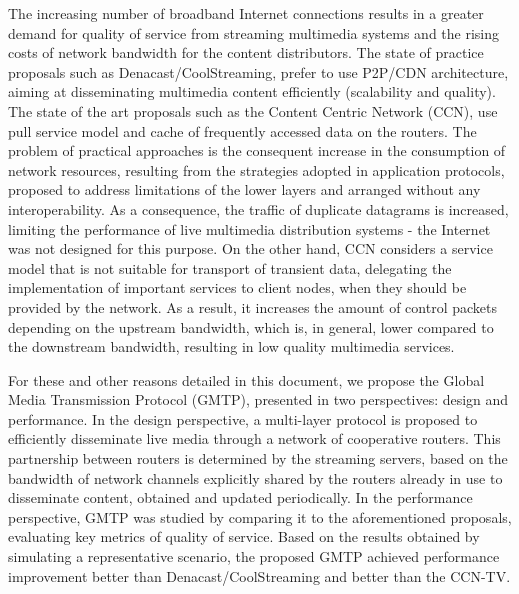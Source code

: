 The increasing number of broadband Internet connections results in a greater demand for quality of service from streaming multimedia systems and the rising costs of network bandwidth for the content distributors. The state of practice proposals such as Denacast/CoolStreaming, prefer to use P2P/CDN architecture, aiming at disseminating multimedia content efficiently (scalability and quality). The state of the art proposals such as the Content Centric Network (CCN), use pull service model and cache of frequently accessed data on the routers. The problem of practical approaches is the consequent increase in the consumption of network resources, resulting from the strategies adopted in application protocols, proposed to address limitations of the lower layers and arranged without any interoperability. As a consequence, the traffic of duplicate datagrams is increased, limiting the performance of live multimedia distribution systems - the Internet was not designed for this purpose. On the other hand, CCN considers a service model that is not suitable for transport of transient data, delegating the implementation of important services to client nodes, when they should be provided by the network. As a result, it increases the amount of control packets depending on the upstream bandwidth, which is, in general, lower compared to the downstream bandwidth, resulting in low quality multimedia services.

For these and other reasons detailed in this document, we propose the Global Media Transmission Protocol (GMTP), presented in two perspectives: design and performance. In the design perspective, a multi-layer protocol is proposed to efficiently disseminate live media through a network of cooperative routers. This partnership between routers is determined by the streaming servers, based on the bandwidth of network channels explicitly shared by the routers already in use to disseminate content, obtained and updated periodically. In the performance perspective, GMTP was studied by comparing it to the aforementioned proposals, evaluating key metrics of quality of service. Based on the results obtained by simulating a representative scenario,  the proposed GMTP achieved  performance improvement  better than Denacast/CoolStreaming and  better than the CCN-TV.